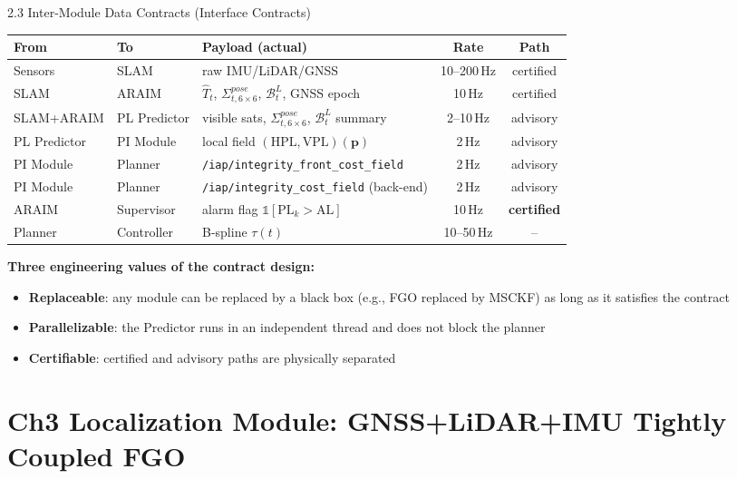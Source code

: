 \documentclass[10pt,aspectratio=169,xcolor=dvipsnames]{beamer}
\newcommand{\PL}{\mathrm{PL}}
\newcommand{\HPL}{\mathrm{HPL}}
\newcommand{\VPL}{\mathrm{VPL}}
\newcommand{\1}{\mathbb{1}}
\newcommand{\innov}[1]{\textcolor{NavyBlue}{\textbf{#1}}}
\begin{document}
\begin{frame}{2.3 Inter-Module Data Contracts (Interface Contracts)}
  \scriptsize
  \begin{table}
    \begin{tabular}{lllcc}
      \toprule
      \textbf{From} & \textbf{To} & \textbf{Payload (actual)} & \textbf{Rate} & \textbf{Path}\\
      \midrule
      Sensors & SLAM & raw IMU/LiDAR/GNSS & 10--200\,Hz & certified\\
      SLAM & ARAIM & $\hat{T}_t$, $\Sigma^{pose}_{t,6\times 6}$, $\mathcal{B}^L_t$, GNSS epoch & 10\,Hz & certified\\
      SLAM+ARAIM & PL Predictor & visible sats, $\Sigma^{pose}_{t,6\times 6}$, $\mathcal{B}^L_t$ summary & 2--10\,Hz & advisory\\
      PL Predictor & PI Module & local field $(\HPL,\VPL)(\bm{p})$ & 2\,Hz & advisory\\
      PI Module & Planner & \texttt{/iap/integrity\_front\_cost\_field} & 2\,Hz & advisory\\
      PI Module & Planner & \texttt{/iap/integrity\_cost\_field} (back-end) & 2\,Hz & advisory\\
      ARAIM & Supervisor & alarm flag $\1[\PL_k > \mathrm{AL}]$ & 10\,Hz & \innov{certified}\\
      Planner & Controller & B-spline $\tau(t)$ & 10--50\,Hz & --\\
      \bottomrule
    \end{tabular}
  \end{table}

  \vspace{6pt}
  \textbf{Three engineering values of the contract design:}
  \begin{itemize}\small
    \item \textbf{Replaceable}: any module can be replaced by a black box (e.g., FGO replaced by MSCKF) as long as it satisfies the contract
    \item \textbf{Parallelizable}: the Predictor runs in an independent thread and does not block the planner
    \item \textbf{Certifiable}: certified and advisory paths are physically separated
  \end{itemize}
\end{frame}

\section{Ch3 Localization Module: GNSS+LiDAR+IMU Tightly Coupled FGO}
\end{document}
